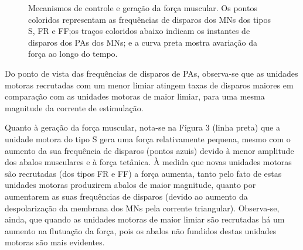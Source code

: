 \begin{figure}[h]
  \centering
  \caption{Mecanismos de controle e geração da força muscular. Os pontos coloridos representam as frequências de disparos dos MNs dos tipos S, FR e FF;os traços coloridos abaixo indicam os instantes de disparos dos PAs dos MNs; e a curva preta mostra avariação da força ao longo do tempo.}
  \label{fig:fig3}
\end{figure}

Do ponto de vista das frequências de disparos de PAs, observa-se que as unidades motoras recrutadas com um menor limiar atingem taxas de disparos maiores em comparação com as unidades motoras de maior limiar, para uma mesma magnitude da corrente de estimulação.

Quanto à geração da força muscular, nota-se na Figura 3 (linha preta) que a unidade motora do tipo S gera uma força relativamente pequena, mesmo com o aumento da sua frequência de disparos (pontos azuis) devido à menor amplitude dos abalos musculares e à força tetânica. À medida que novas unidades motoras são recrutadas (dos tipos FR e FF) a força aumenta, tanto pelo fato de estas unidades motoras produzirem abalos de maior magnitude, quanto por aumentarem as suas frequências de disparos (devido ao aumento da despolarização da membrana dos MNs pela corrente triangular). Observa-se, ainda, que quando as unidades motoras de maior limiar são recrutadas há um aumento na flutuação da força, pois os abalos não fundidos destas unidades motoras são mais evidentes.

